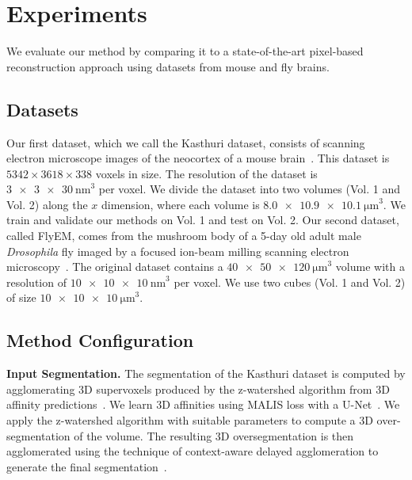 \section{Experiments}




We evaluate our method by comparing it to a state-of-the-art pixel-based reconstruction approach using datasets from mouse and fly brains.

\subsection{Datasets}
\label{sec:dataset}

Our first dataset, which we call the Kasthuri dataset, consists of scanning electron microscope images of the neocortex of a mouse brain~\cite{kasthuri2015saturated}. 
This dataset is $5342 \times 3618 \times 338$ voxels in size. 
The resolution of the dataset is $\SI[product-units=single]{3 x 3 x 30}{\nano\meter}^3$ per voxel. 
We divide the dataset into two volumes (Vol. 1 and Vol. 2) along the $x$ dimension, where each volume is $\SI[product-units=single]{8.0 x 10.9 x 10.1}{\micro\meter}^3$.
We train and validate our methods on Vol. 1 and test on Vol. 2.
Our second dataset, called FlyEM, comes from the mushroom body of a 5-day old adult male \textit{Drosophila} fly imaged by a focused ion-beam milling scanning electron microscopy~\cite{takemura2017connectome}.
The original dataset contains a $\SI[product-units=single]{40 x 50 x 120}{\micro\meter}^3$ volume with a resolution of $\SI[product-units=single]{10 x 10 x 10}{\nano\meter}^3$ per voxel. 
We use two cubes (Vol. 1 and Vol. 2) of size $\SI[product-units=single]{10 x 10 x 10}{\micro\meter}^3$.


\subsection{Method Configuration}

\noindent\textbf{Input Segmentation.}
The segmentation of the Kasthuri dataset is computed by agglomerating 3D supervoxels produced by the z-watershed algorithm from 3D affinity predictions~\cite{zlateski2015image}. 
We learn 3D affinities using MALIS loss with a U-Net~\cite{ronneberger2015u,Turaga:2009}. 
We apply the z-watershed algorithm with suitable parameters to compute a 3D over-segmentation of the volume. 
The resulting 3D oversegmentation is then agglomerated using the technique of context-aware delayed agglomeration to generate the final segmentation~\cite{10.1371/journal.pone.0125825}.

